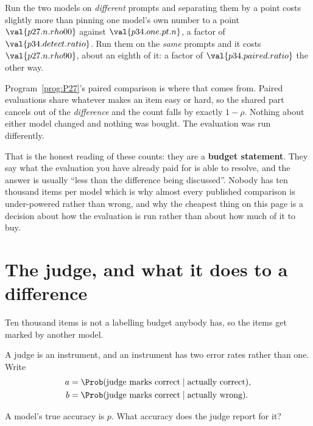 \begin{fr}

Run the two models on \emph{different} prompts and separating them by a point
costs slightly more than pinning one model's own number to a point \dash{}
$\val{p27.n.rho00}$ against $\val{p34.one.pt.n}$, a factor of
$\val{p34.detect.ratio}$. Run them on the \emph{same} prompts and it costs
$\val{p27.n.rho90}$, about an eighth of it: a factor of
$\val{p34.paired.ratio}$ the other way.

Program~\ref{prog:P27}'s paired comparison is where that comes from. Paired
evaluations share whatever makes an item easy or hard, so the shared part
cancels out of the \emph{difference} and the count falls by exactly
$1-\rho$. Nothing about either model changed and nothing was bought. The
evaluation was run differently.

\begin{note}
That is the honest reading of these counts: they are a \textbf{budget
statement}. They say what the evaluation you have already paid for is able to
resolve, and the answer is usually \enquote{less than the difference being
discussed}. Nobody has ten thousand items per model \dash{} which is why
almost every published comparison is under-powered rather than wrong, and why
the cheapest thing on this page is a decision about how the evaluation is
run rather than about how much of it to buy.
\end{note}
\end{fr}

\section{The judge, and what it does to a difference}
\label{sec:P34-judge}

\begin{fr}
Ten thousand items is not a labelling budget anybody has, so the items get
marked by another model.

A judge is an instrument, and an instrument has two error rates rather than
one. Write
\begin{align*}
  a &= \Prob(\text{judge marks correct} \mid \text{actually correct}), \\
  b &= \Prob(\text{judge marks correct} \mid \text{actually wrong}).
\end{align*}

A model's true accuracy is $p$. What accuracy does the judge report for it?
\dotline
\nextframe
\end{fr}


